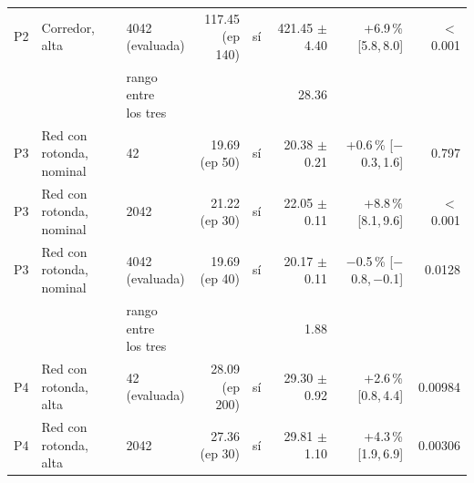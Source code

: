 \begin{table}[H]
\begin{tabular}{lllrlrrr}
P2 & \makecell[l]{Corredor,\\{}alta} & \makecell[l]{4042\\{}(evaluada)} & \makecell[r]{117.45\\{}(ep 140)} & sí & \makecell[r]{421.45\\{}$\pm$ 4.40} & \makecell[r]{+6.9\,\%\\{}[5.8,\,8.0]} & $<$\,0.001 \\
 & & \makecell[l]{rango entre\\{}los tres} & & & 28.36 & & \\
P3 & \makecell[l]{Red con rotonda,\\{}nominal} & 42 & \makecell[r]{19.69\\{}(ep 50)} & sí & \makecell[r]{20.38\\{}$\pm$ 0.21} & \makecell[r]{+0.6\,\%\\{}[$-$0.3,\,1.6]} & 0.797 \\
P3 & \makecell[l]{Red con rotonda,\\{}nominal} & 2042 & \makecell[r]{21.22\\{}(ep 30)} & sí & \makecell[r]{22.05\\{}$\pm$ 0.11} & \makecell[r]{+8.8\,\%\\{}[8.1,\,9.6]} & $<$\,0.001 \\
P3 & \makecell[l]{Red con rotonda,\\{}nominal} & \makecell[l]{4042\\{}(evaluada)} & \makecell[r]{19.69\\{}(ep 40)} & sí & \makecell[r]{20.17\\{}$\pm$ 0.11} & \makecell[r]{$-$0.5\,\%\\{}[$-$0.8,\,$-$0.1]} & 0.0128 \\
 & & \makecell[l]{rango entre\\{}los tres} & & & 1.88 & & \\
P4 & \makecell[l]{Red con rotonda,\\{}alta} & \makecell[l]{42\\{}(evaluada)} & \makecell[r]{28.09\\{}(ep 200)} & sí & \makecell[r]{29.30\\{}$\pm$ 0.92} & \makecell[r]{+2.6\,\%\\{}[0.8,\,4.4]} & 0.00984 \\
P4 & \makecell[l]{Red con rotonda,\\{}alta} & 2042 & \makecell[r]{27.36\\{}(ep 30)} & sí & \makecell[r]{29.81\\{}$\pm$ 1.10} & \makecell[r]{+4.3\,\%\\{}[1.9,\,6.9]} & 0.00306 \\

\end{tabular}
\end{table}
